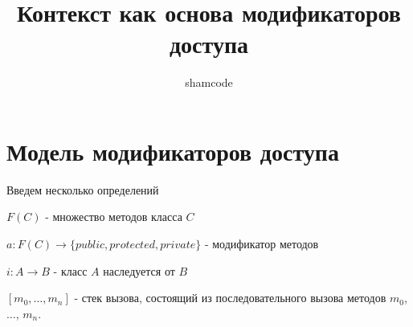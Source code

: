 \documentclass[graybox]{svmult}
\begin{document}
\title*{Контекст как основа модификаторов доступа}
\author{shamcode}
\maketitle


\section{Модель модификаторов доступа}
\label{sec:1}
Введем несколько определений
\begin{definition}
$F(C)$ - множество методов класса $C$
\end{definition}

\begin{definition}
$a: F(C) \to \{public, protected, private\}$ - модификатор методов
\end{definition}

\begin{definition}
$i: A \to B$ - класс $A$ наследуется от $B$
\end{definition}

\begin{definition}
$[m_0, \dots, m_n]$ - стек вызова, состоящий из последовательного вызова методов $m_0$, $\dots$, $m_n$. 
\end{definition}
\end{document}
